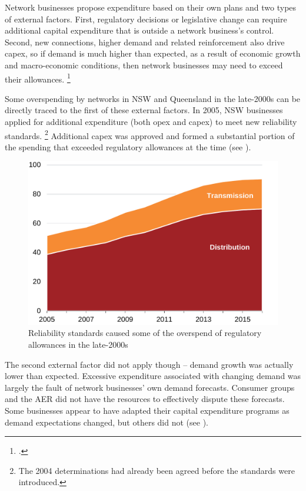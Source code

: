 \documentclass[FrontPage]{grattan}
\begin{document}
Network businesses propose expenditure based on their own plans and two types of external factors. First, regulatory decisions or legislative change can require additional capital expenditure that is outside a network business's control. Second, new connections, higher demand and related reinforcement also drive capex, so if demand is much higher than expected, as a result of economic growth and macro-economic conditions, then network businesses may need to exceed their allowances.%
\footcite{ParsonsBrinckerhoff2012OverspendReview}

Some overspending by networks in NSW and Queensland in the late-2000s can be directly traced to the first of these external factors. In 2005, NSW businesses applied for additional expenditure (both opex and capex) to meet new reliability standards.%
\footnote{The 2004 determinations had already been agreed before the standards were introduced.}
Additional capex was approved and formed a substantial portion of the spending that exceeded regulatory allowances at the time (see ).

\begin{figure}
\caption{Reliability standards caused some of the overspend of regulatory allowances in the late-2000s}\label{fig:reliability-share-of-overspend}
\includegraphics[page=32]{atlas/Charts.pdf}
\end{figure}

The second external factor did not apply though -- demand growth was actually lower than expected. Excessive expenditure associated with changing demand was largely the fault of network businesses' own demand forecasts. Consumer groups and the AER did not have the resources to effectively dispute these forecasts. Some businesses appear to have adapted their capital expenditure programs as demand expectations changed, but others did not (see ). 
\end{document}
